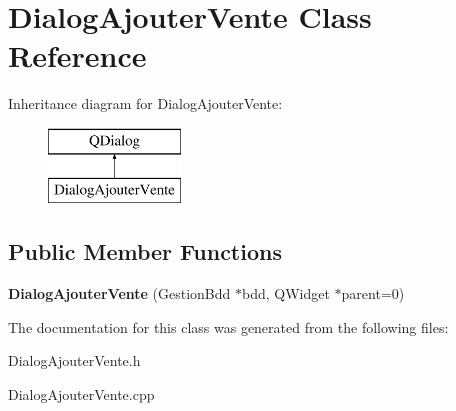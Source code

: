 \section{Dialog\-Ajouter\-Vente Class Reference}
\label{class_dialog_ajouter_vente}
Inheritance diagram for Dialog\-Ajouter\-Vente\-:\begin{figure}[H]
\begin{center}
\leavevmode
\includegraphics[height=2.000000cm]{class_dialog_ajouter_vente}
\end{center}
\end{figure}
\subsection*{Public Member Functions}
\begin{DoxyCompactItemize}
\item 
{\bfseries Dialog\-Ajouter\-Vente} (Gestion\-Bdd $\ast$bdd, Q\-Widget $\ast$parent=0)\label{class_dialog_ajouter_vente_a891c176f7c824ede407e79dd31b3aafa}

\end{DoxyCompactItemize}


The documentation for this class was generated from the following files\-:\begin{DoxyCompactItemize}
\item 
Dialog\-Ajouter\-Vente.\-h\item 
Dialog\-Ajouter\-Vente.\-cpp\end{DoxyCompactItemize}
